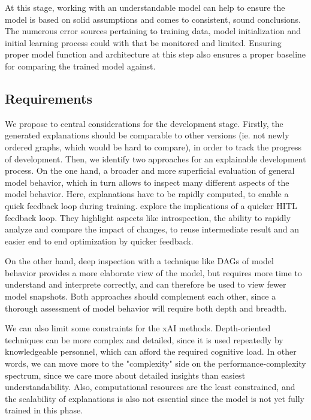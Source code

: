 \documentclass[twoside,11pt]{article}
\begin{document}
At this stage, working with an understandable model can help to ensure the model is based on solid assumptions and comes to consistent, sound conclusions. The numerous error sources pertaining to training data, model initialization and initial learning process could with that be monitored and limited.
Ensuring proper model function and architecture at this step also ensures a proper baseline for comparing the trained model against.

\subsection{Requirements}
We propose to central considerations for the development stage. Firstly, the generated explanations should be comparable to other versions (ie. not newly ordered graphs, which would be hard to compare), in order to track the progress of development. 
Then, we identify two approaches for an explainable development process. On the one hand, a broader and more superficial evaluation of general model behavior, which in turn allows to inspect many different aspects of the model behavior. Here, explanations have to be rapidly computed, to enable a quick feedback loop during training. 
\citet{XinEtAl:2018:HITLMLFeedbackLoop} explore the implications of a quicker HITL feedback loop. They highlight aspects like introspection, the ability to rapidly analyze and compare the impact of changes, to reuse intermediate result and an easier end to end optimization by quicker feedback.

On the other hand, deep inspection with a technique like DAGs of model behavior provides a more elaborate view of the model, but requires more time to understand and interprete correctly, and can therefore be used to view fewer model snapshots. Both approaches should complement each other, since a thorough assessment of model behavior will require both depth and breadth.

We can also limit some constraints for the xAI methods. Depth-oriented techniques can be more complex and detailed, since it is used repeatedly by knowledgeable personnel, which can afford the required cognitive load. In other words, we can move more to the "complexity" side on the performance-complexity spectrum, since we care more about detailed insights than easiest understandability.
Also, computational resources are the least constrained, and the scalability of explanations is also not essential since the model is not yet fully trained in this phase.
\end{document}

